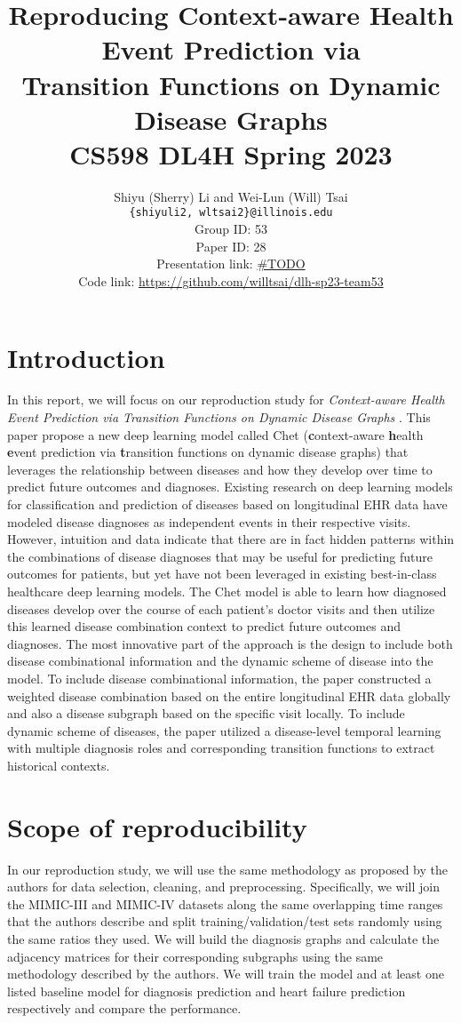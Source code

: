 \documentclass[11pt,a4paper,fleqn]{article}
\title{ Reproducing Context-aware Health Event Prediction via \\
  Transition Functions on Dynamic Disease Graphs \cite{chet} \\
  CS598 DL4H Spring 2023 }
\author{Shiyu (Sherry) Li and Wei-Lun (Will) Tsai \\
  \texttt{\{shiyuli2, wltsai2\}@illinois.edu} \\[2em]
  Group ID: 53\\
  Paper ID: 28\\
  Presentation link: \url{\#TODO} \\
  Code link: \url{https://github.com/willtsai/dlh-sp23-team53}}
\begin{document}
\maketitle


\section{Introduction}
In this report, we will focus on our reproduction study for
\textit{Context-aware Health Event Prediction via Transition Functions on
Dynamic Disease Graphs} \cite{chet}. This paper propose a new deep learning
model called Chet (\textbf{c}ontext-aware \textbf{h}ealth \textbf{e}vent
prediction via \textbf{t}ransition functions on dynamic disease graphs) that
leverages the relationship between diseases and how they develop over time to
predict future outcomes and diagnoses. Existing research on deep learning models
for classification and prediction of diseases based on longitudinal EHR data
have modeled disease diagnoses as independent events in their respective visits.
However, intuition and data indicate that there are in fact hidden patterns
within the combinations of disease diagnoses that may be useful for predicting
future outcomes for patients, but yet have not been leveraged in existing
best-in-class healthcare deep learning models. The Chet model is able to learn
how diagnosed diseases develop over the course of each patient's doctor visits
and then utilize this learned disease combination context to predict future
outcomes and diagnoses. The most innovative part of the approach is the design
to include both disease combinational information and the dynamic scheme of
disease into the model. To include disease combinational information, the paper
constructed a weighted disease combination based on the entire longitudinal EHR
data globally and also a disease subgraph based on the specific visit locally.
To include dynamic scheme of diseases, the paper utilized a disease-level
temporal learning with multiple diagnosis roles and corresponding transition
functions to extract historical contexts.

\section{Scope of reproducibility}
In our reproduction study, we will use the same methodology as proposed by the
authors for data selection, cleaning, and preprocessing. Specifically, we will
join the MIMIC-III \cite{mimic3} and MIMIC-IV \cite{mimic4} datasets along the
same overlapping time ranges that the authors describe and split
training/validation/test sets randomly using the same ratios they used. We will
build the diagnosis graphs and calculate the adjacency matrices for their
corresponding subgraphs using the same methodology described by the authors. We
will train the model and at least one listed baseline model for diagnosis
prediction and heart failure prediction respectively and compare the
performance.
\end{document}
